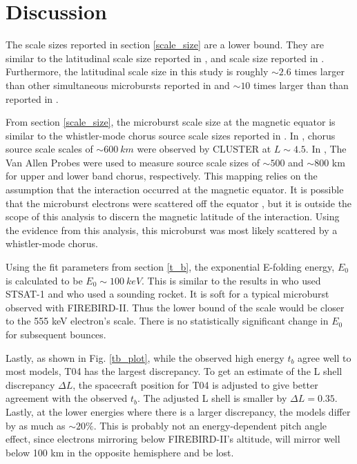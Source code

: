 \documentclass[draft,linenumbers]{agujournal}
\begin{document}
\section{Discussion} \label{discussion}
The scale sizes reported in section \ref{scale_size} are a lower bound. They are similar to the latitudinal scale size reported in \citet{Blake96}, and scale size reported in \citet{Parks1967}. Furthermore, the latitudinal scale size in this study is roughly $\sim 2.6$ times larger than other simultaneous microbursts reported in \citet{Crew16} and $\sim 10$ times larger than than reported in \citet{Dietrich10}.

From section \ref{scale_size}, the microburst scale size at the magnetic equator is similar to the whistler-mode chorus source scale sizes reported in \citet{Agapitov11b, Agapitov17a}. In \citet{Agapitov11b}, chorus source scale scales of $\sim 600 \ km$ were observed by CLUSTER at $L \sim 4.5$. In \citet{Agapitov17a}, The Van Allen Probes were used to measure source scale sizes of $\sim 500$ and $\sim 800$ km for upper and lower band chorus, respectively. This mapping relies on the assumption that the interaction occurred at the magnetic equator. It is possible that the microburst electrons were scattered off the equator \citep{Lorentzen01b}, but it is outside the scope of this analysis to discern the magnetic latitude of the interaction. Using the evidence from this analysis, this microburst was most likely scattered by a whistler-mode chorus.

Using the fit parameters from section \ref{t_b}, the exponential E-folding energy, $E_0$ is calculated to be $E_0 \sim 100 \ keV$. This is similar to the results in \citet{Lee05} who used STSAT-1 and \citet{Datta1997} who used a sounding rocket. It is soft for a typical microburst observed with FIREBIRD-II. Thus the lower bound of the scale would be closer to the 555 keV electron's scale. There is no statistically significant change in $E_0$ for subsequent bounces.

Lastly, as shown in Fig. \ref{tb_plot}, while the observed high energy $t_b$ agree well to most models, T04 has the largest discrepancy. To get an estimate of the L shell discrepancy $\Delta L$, the spacecraft position for T04 is adjusted to give better agreement with the observed $t_b$. The adjusted L shell is smaller by $\Delta L = 0.35$. Lastly, at the lower energies where there is a larger discrepancy, the models differ by as much as $\sim 20 \%$. This is probably not an energy-dependent pitch angle effect, since electrons mirroring below FIREBIRD-II's altitude, will mirror well below 100 km in the opposite hemisphere and be lost.
\end{document}
